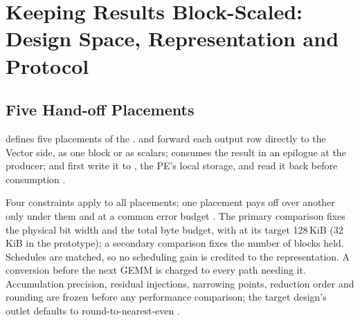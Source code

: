 
\section{Keeping Results Block-Scaled: Design Space, Representation and Protocol}\label{sec:design}

\begin{table}[t]
\centering{}%
\caption{The five \handoff placements. B/S: block or scalar representation; D/M/E: direct, through storage, or fused epilogue.}\label{tab:placements}

\end{table}

\subsection{Five Hand-off Placements}\label{sec:placements}

%
 defines five placements of the \handoff.
\armBD and \armSD forward each output row directly to the Vector side, as one block or as scalars; \armSE consumes the result in an epilogue at the producer; \armBM and \armSM first write it to \Lii, the PE's local storage, and read it back before consumption
.

%
Four constraints apply to all placements; one placement pays off over another only under them and at a common error budget
.
The primary comparison fixes the physical bit width and the total byte budget, with \Lii at its target 128\,KiB (32\,KiB in the prototype); a secondary comparison fixes the number of blocks held.
Schedules are matched, so no scheduling gain is credited to the representation.
A conversion before the next GEMM is charged to every path needing it.
Accumulation precision, residual injections, narrowing points, reduction order and rounding are frozen before any performance comparison; the target design's outlet defaults to round-to-nearest-even
.


